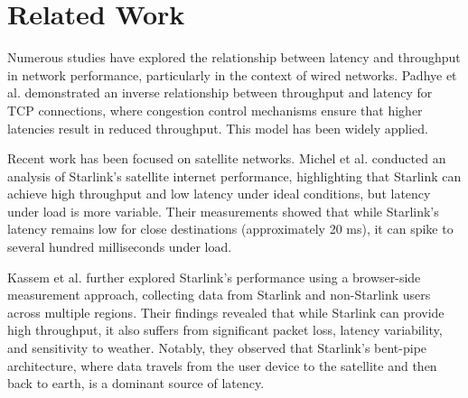 \section{Related Work} \label{sec:related_work}
Numerous studies have explored the relationship between latency and throughput in network performance, 
particularly in the context of wired networks. Padhye et al. demonstrated an inverse
relationship  between throughput and latency for TCP connections, where congestion 
control mechanisms ensure that higher latencies result in reduced throughput. This 
model has been widely applied. 

Recent work has been focused on satellite networks. Michel et al. conducted an 
analysis of Starlink’s satellite internet performance, highlighting that Starlink can 
achieve high throughput and low latency under ideal conditions, but latency under load
is more variable. Their measurements showed that while Starlink's latency remains low
for close destinations (approximately 20 ms), it can spike to several hundred milliseconds under load. 

Kassem et al. further explored Starlink's performance using a browser-side measurement approach, 
collecting data from Starlink and non-Starlink users across multiple regions. 
Their findings revealed that while Starlink can provide high throughput, it also 
suffers from significant packet loss, latency variability, and sensitivity to weather. 
Notably, they observed that Starlink's bent-pipe architecture, where data travels from 
the user device to the satellite and then back to earth, is a dominant source of latency.

